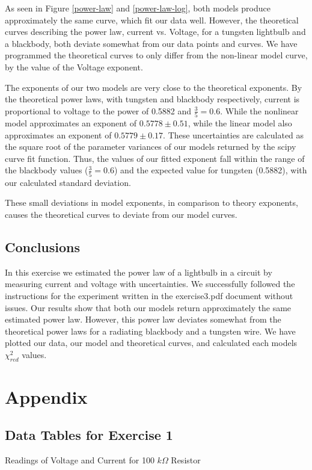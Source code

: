 \documentclass[letterpaper,12pt]{article}
\begin{document}
As seen in Figure \ref{power-law} and \ref{power-law-log}, both models produce approximately the same curve, which fit our data well. However, the theoretical curves describing the power law, current vs. Voltage, for a tungsten lightbulb and a blackbody, both deviate somewhat from our data points and curves. We have programmed the theoretical curves to only differ from the non-linear model curve, by the value of the Voltage exponent.

The exponents of our two models are very close to the theoretical exponents. 
By the theoretical power laws, with tungsten and blackbody respectively, 
current is proportional to voltage to the power of 0.5882 and $\frac{3}{5} = 0.6$. 
While the nonlinear model approximates an exponent of $0.5778 \pm 0.51$,
while the linear model also approximates an exponent of $0.5779 \pm 0.17$. 
These uncertainties are calculated as the square root of the parameter 
variances of our models returned by the scipy curve fit function. 
Thus, the values of our fitted exponent fall within the range of the blackbody 
values ($\frac{3}{5}=0.6$) and the expected value for tungsten (0.5882), 
with our calculated standard deviation.

These small deviations in model exponents, in comparison to theory exponents, 
causes the theoretical curves to deviate from our model curves.

\subsection{Conclusions}

In this exercise we estimated the power law of a lightbulb in a circuit by measuring current and voltage with uncertainties. We successfully followed the instructions for the experiment written in the exercise3.pdf document without issues. Our results show that both our models return approximately the same estimated power law. However, this power law deviates somewhat from the theoretical power laws for a radiating blackbody and a tungsten wire. We have plotted our data, our model and theoretical curves, and calculated each models $\chi^2_{red}$ values. 

\pagebreak

\section{Appendix}

\subsection{Data Tables for Exercise 1}
\begin{table}[H]
  \centering
  \caption{Readings of Voltage and Current for 100 $k\Omega$ Resistor}
  \label{100kdata}
\end{table}
\end{document}
